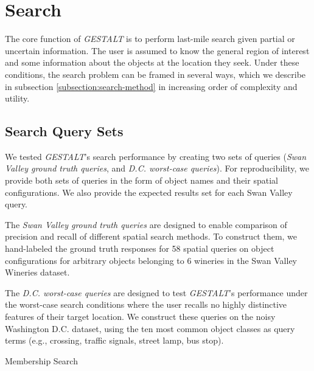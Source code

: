 \section{Search}
\label{section:search}

The core function of \textit{GESTALT} is to perform last-mile search given partial or uncertain information.
The user is assumed to know the general region of interest and some information about the objects at the location they seek.
Under these conditions, the search problem can be framed in several ways, which we describe in subsection \ref{subsection:search-method} in increasing order of complexity and utility.

\subsection{Search Query Sets}
We tested \emph{GESTALT}'s search performance by creating two sets of queries (\textit{Swan Valley ground truth queries}, and \textit{D.C. worst-case queries}). 
For reproducibility, we provide both sets of queries in the form of object names and their spatial configurations. 
We also provide the expected results set for each Swan Valley query. 
\par{The \textit{Swan Valley ground truth queries} are designed to enable comparison of precision and recall of different spatial search methods. 
To construct them, we hand-labeled the ground truth responses for 58 spatial queries on object configurations for arbitrary objects belonging to 6 wineries in the Swan Valley Wineries dataset. 
}
\par{The \textit{D.C. worst-case queries} are designed to test \emph{GESTALT}'s performance under the worst-case search conditions where the user recalls no highly distinctive features of their target location.
}
We construct these queries on the noisy Washington D.C. dataset, using the ten most common object classes as query terms (e.g., crossing, traffic signals, street lamp, bus stop).

\begin{algorithm}
    \caption{Membership Search}\label{alg:search}
    \begin{algorithmic}
        \State{- - - - -}
            \EndFor
            \EndProcedure
    \end{algorithmic}
\end{algorithm}


